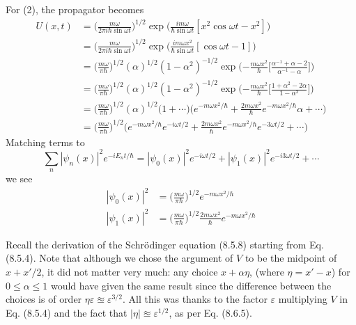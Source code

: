 \documentclass[../principles-of-quantum-mechanics.tex]{subfiles}
\begin{document}
\begin{questions}
\begin{solution}
			For (2), the propagator becomes
			\begin{align*}
				U(x, t) &= \Big(\frac{m\omega}{2\pi i\hbar\sin\omega t}\Big)^{1/2}\exp\Big(\frac{im\omega}{\hbar\sin\omega t}[x^2\cos\omega t - x^2]\Big) \\
				&= \Big(\frac{m\omega}{2\pi i\hbar\sin\omega t}\Big)^{1/2}\exp\Big(\frac{im\omega x^2}{\hbar\sin\omega t}[\cos\omega t - 1]\Big) \\
				&= \Big(\frac{m\omega}{\pi\hbar}\Big)^{1/2}(\alpha)^{1/2}(1 - \alpha^2)^{-1/2}\exp\Big({-\frac{m\omega x^2}{\hbar}}\Big[\frac{\alpha^{-1} + \alpha - 2}{\alpha^{-1} - \alpha}\Big]\Big) \\
				&= \Big(\frac{m\omega}{\pi\hbar}\Big)^{1/2}(\alpha)^{1/2}(1 - \alpha^2)^{-1/2}\exp\Big({-\frac{m\omega x^2}{\hbar}}\Big[\frac{1 + \alpha^2 - 2\alpha}{1 - \alpha^2}\Big]\Big) \\
				&= \Big(\frac{m\omega}{\pi\hbar}\Big)^{1/2}(\alpha)^{1/2}\Big(1 + \cdots\Big)\Big(e^{-m\omega x^2/\hbar} + \frac{2m\omega x^2}{\hbar}e^{-m\omega x^2/\hbar}\alpha + \cdots\Big) \\
				&= \Big(\frac{m\omega}{\pi\hbar}\Big)^{1/2}\Big(e^{-m\omega x^2/\hbar}e^{-i\omega t/2} + \frac{2m\omega x^2}{\hbar}e^{-m\omega x^2/\hbar}e^{-3\omega t/2} + \cdots\Big)
			\end{align*}
			Matching terms to 
			$$\sum_n|\psi_n(x)|^2e^{-iE_nt/\hbar} = |\psi_0(x)|^2e^{-i\omega t/2} + |\psi_1(x)|^2e^{-i3\omega t/2} + \cdots$$
			we see
			\begin{align*}
				|\psi_0(x)|^2 &= \Big(\frac{m\omega}{\pi\hbar}\Big)^{1/2}e^{-m\omega x^2/\hbar} \\
				|\psi_1(x)|^2 &= \Big(\frac{m\omega}{\pi\hbar}\Big)^{1/2}\frac{2m\omega x^2}{\hbar}e^{-m\omega x^2/\hbar}
			\end{align*}
		\end{solution}
		
		\question Recall the derivation of the Schr\"odinger equation (8.5.8) starting from Eq. (8.5.4). Note that although we chose the argument of $V$ to be the midpoint of $x + x'/2$, it did not matter very much: any choice $x + \alpha\eta$, (where $\eta = x' - x$) for $0 \leq \alpha \leq 1$ would have given the same result since the difference between the choices is of order $\eta\varepsilon \approxeq \varepsilon^{3/2}$. All this was thanks to the factor $\varepsilon$ multiplying $V$ in Eq. (8.5.4) and the fact that $|\eta| \approxeq \varepsilon^{1/2}$, as per Eq. (8.6.5).
		

\end{questions}
\end{document}
